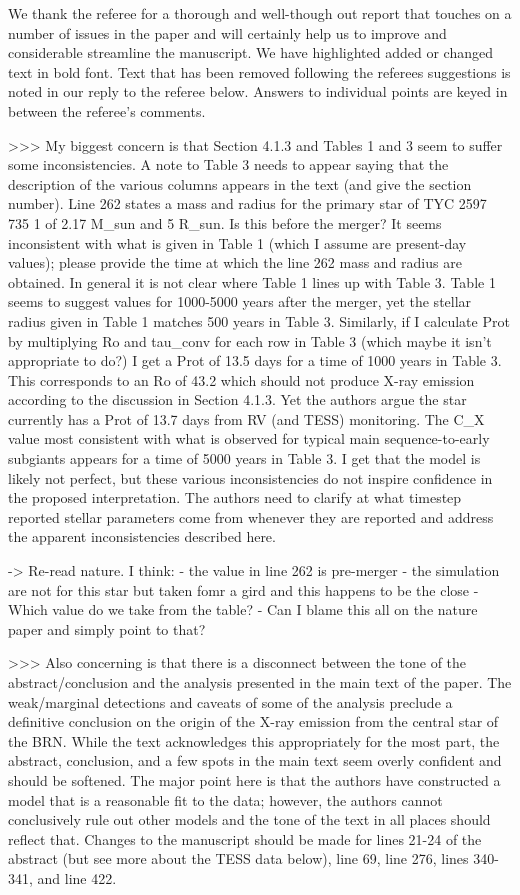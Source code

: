 We thank the referee for a thorough and well-though out report that touches on a number of issues in the paper and will certainly help us to improve and considerable streamline the manuscript. We have highlighted added or changed text in bold font. Text that has been removed following the referees suggestions is noted in our reply to the referee below. Answers to individual points are keyed in between the referee's comments.



>>> My biggest concern is that Section 4.1.3 and Tables 1 and 3 seem to suffer some inconsistencies. A note to Table 3 needs to appear saying that the description of the various columns appears in the text (and give the section number). Line 262 states a mass and radius for the primary star of TYC 2597 735 1 of 2.17 M_sun and 5 R_sun. Is this before the merger? It seems inconsistent with what is given in Table 1 (which I assume are present-day values); please provide the time at which the line 262 mass and radius are obtained. In general it is not clear where Table 1 lines up with Table 3. Table 1 seems to suggest values for 1000-5000 years after the merger, yet the stellar radius given in Table 1 matches 500 years in Table 3. Similarly, if I calculate Prot by multiplying Ro and tau_conv for each row in Table 3 (which maybe it isn't appropriate to do?) I get a Prot of 13.5 days for a time of 1000 years in Table 3. This corresponds to an Ro of 43.2 which should not produce X-ray emission according to the discussion in Section 4.1.3. Yet the authors argue the star currently has a Prot of 13.7 days from RV (and TESS) monitoring. The C_X value most consistent with what is observed for typical main sequence-to-early subgiants appears for a time of 5000 years in Table 3. I get that the model is likely not perfect, but these various inconsistencies do not inspire confidence in the proposed interpretation. The authors need to clarify at what timestep reported stellar parameters come from whenever they are reported and address the apparent inconsistencies described here.


-> Re-read nature. I think:
- the value in line 262 is pre-merger
- the simulation are not for this star but taken fomr a gird and this happens to be the close
- Which value do we take from the table?
- Can I blame this all on the nature paper and simply point to that?

>>> Also concerning is that there is a disconnect between the tone of the abstract/conclusion and the analysis presented in the main text of the paper. The weak/marginal detections and caveats of some of the analysis preclude a definitive conclusion on the origin of the X-ray emission from the central star of the BRN. While the text acknowledges this appropriately for the most part, the abstract, conclusion, and a few spots in the main text seem overly confident and should be softened. The major point here is that the authors have constructed a model that is a reasonable fit to the data; however, the authors cannot conclusively rule out other models and the tone of the text in all places should reflect that. Changes to the manuscript should be made for lines 21-24 of the abstract (but see more about the TESS data below), line 69, line 276, lines 340-341, and line 422.

